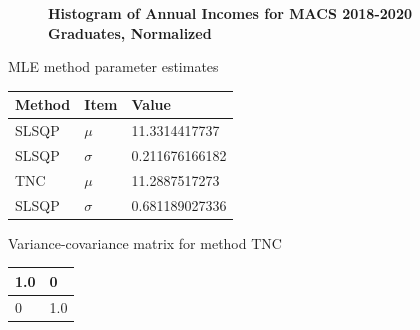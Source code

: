 \documentclass[letterpaper,12pt]{article}
\theoremstyle{definition}
\begin{document}
\begin{figure}[htb]\centering\captionsetup{width=4.0in}
  \caption{\textbf{Histogram of Annual Incomes for MACS 2018-2020 Graduates, Normalized}}\label{FigPS2_1b. Note: for visualization purposes, the normalized number of graduates has been used to generate the histogram. The y-axis scale for the histogram in Part 1a makes it difficult to view any details of the plotted PDF lines. This is contrary to the PS2 directions, which ask for the initial "guess" and estimated MLE PDF lines to be plotted against the histogram from Part 1a. }
\end{figure}

\begin{center}
    \caption{MLE method parameter estimates}
    \begin{tabular}{ | l | l | p{5cm} |}
    \hline
    Method & Item & Value  \\ \hline
    SLSQP & $\mu$ & 11.3314417737  \\ \hline
    SLSQP & $\sigma$  & 0.211676166182 \\ \hline
    TNC & $\mu$ & 11.2887517273 \\ \hline
    SLSQP & $\sigma$  & 0.681189027336 \\ \hline
    \end{tabular}
\end{center}

\begin{center}
    \caption{Variance-covariance matrix for method TNC}
    \begin{tabular}{ | p{1cm}| p{1cm} |}
    \hline
    1.0 & 0  \\ \hline
    0 & 1.0 \\ \hline
    \end{tabular}
\end{center}
\end{document}
